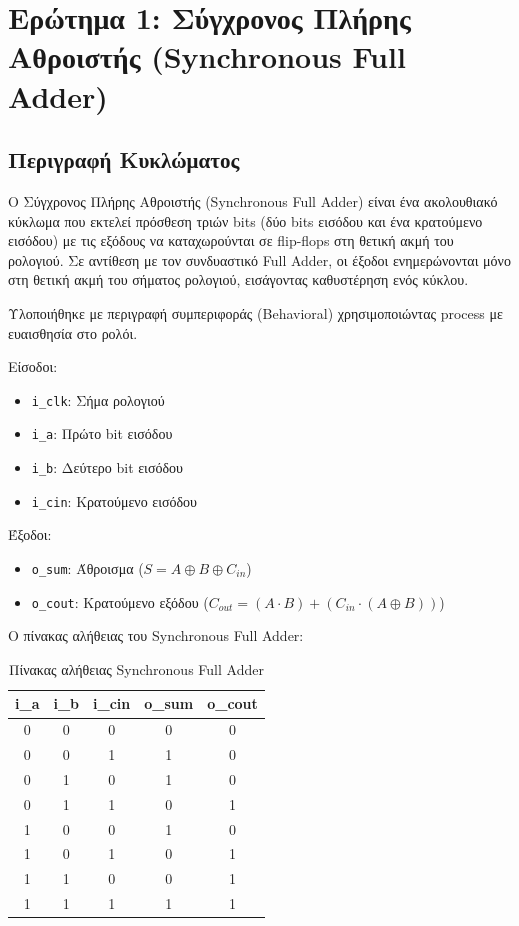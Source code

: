\documentclass[12pt]{article}
\begin{document}
\section*{Ερώτημα 1: Σύγχρονος Πλήρης Αθροιστής (Synchronous Full Adder)}

\subsection*{Περιγραφή Κυκλώματος}

Ο Σύγχρονος Πλήρης Αθροιστής (Synchronous Full Adder) είναι ένα ακολουθιακό κύκλωμα που εκτελεί πρόσθεση τριών bits (δύο bits εισόδου και ένα κρατούμενο εισόδου) με τις εξόδους να καταχωρούνται σε flip-flops στη θετική ακμή του ρολογιού. Σε αντίθεση με τον συνδυαστικό Full Adder, οι έξοδοι ενημερώνονται μόνο στη θετική ακμή του σήματος ρολογιού, εισάγοντας καθυστέρηση ενός κύκλου.

Υλοποιήθηκε με περιγραφή συμπεριφοράς (Behavioral) χρησιμοποιώντας process με ευαισθησία στο ρολόι.

Είσοδοι:
\begin{itemize}
    \item \texttt{i\_clk}: Σήμα ρολογιού
    \item \texttt{i\_a}: Πρώτο bit εισόδου
    \item \texttt{i\_b}: Δεύτερο bit εισόδου
    \item \texttt{i\_cin}: Κρατούμενο εισόδου
\end{itemize}

Έξοδοι:
\begin{itemize}
    \item \texttt{o\_sum}: Άθροισμα ($S = A \oplus B \oplus C_{in}$)
    \item \texttt{o\_cout}: Κρατούμενο εξόδου ($C_{out} = (A \cdot B) + (C_{in} \cdot (A \oplus B))$)
\end{itemize}

Ο πίνακας αλήθειας του Synchronous Full Adder:

\begin{table}[H]
    \centering
    \begin{tabular}{|c|c|c|c|c|}
        \hline
        \textbf{i\_a} & \textbf{i\_b} & \textbf{i\_cin} & \textbf{o\_sum} & \textbf{o\_cout} \\
        \hline
        0 & 0 & 0 & 0 & 0 \\
        \hline
        0 & 0 & 1 & 1 & 0 \\
        \hline
        0 & 1 & 0 & 1 & 0 \\
        \hline
        0 & 1 & 1 & 0 & 1 \\
        \hline
        1 & 0 & 0 & 1 & 0 \\
        \hline
        1 & 0 & 1 & 0 & 1 \\
        \hline
        1 & 1 & 0 & 0 & 1 \\
        \hline
        1 & 1 & 1 & 1 & 1 \\
        \hline
    \end{tabular}
    \caption{Πίνακας αλήθειας Synchronous Full Adder}
    \label{tab:sync_fa_truth}
\end{table}
\end{document}
